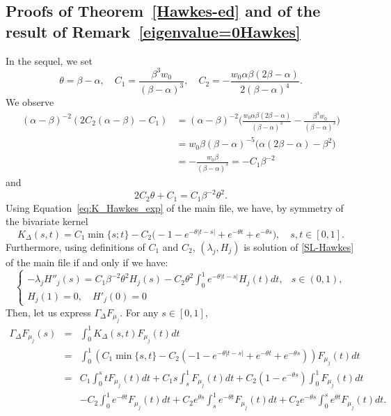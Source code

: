 \documentclass[aos]{imsart}
\theoremstyle{plain}
\theoremstyle{remark}
\newcommand{\1}{1}
\begin{document}
\subsection{Proofs of Theorem~\ref{Hawkes-ed} and of the result of Remark~\ref{eigenvalue=0Hawkes}}
In the sequel, we set
\[
\theta=\beta-\alpha,\quad C_1=\frac{\beta^3w_0}{(\beta-\alpha)^3},\quad C_2=-\frac{w_0\alpha\beta(2\beta-\alpha)}{2(\beta-\alpha)^4}.
\] 
We observe 
\begin{align*}
(\alpha-\beta)^{-2}(2C_2(\alpha-\beta)-C_1)&=(\alpha-\beta)^{-2}\Big(\frac{w_0\alpha\beta(2\beta-\alpha)}{(\beta-\alpha)^3}-\frac{\beta^3w_0}{(\beta-\alpha)^3}\Big)\\
&=w_0\beta(\beta-\alpha)^{-5}\big(\alpha(2\beta-\alpha)-\beta^2\big)\\
&=-\frac{w_0\beta}{(\beta-\alpha)^3}=-C_1\beta^{-2}
\end{align*}
and 
\begin{equation}\label{C1C2}
2C_2\theta +C_1=C_1\beta^{-2}\theta^2.
\end{equation}
Using Equation~\eqref{eq:K_Hawkes_exp} of the main file, we have, by symmetry of the bivariate kernel
\[
K_\Delta(s,t)=C_1\min\{s;t\}-C_2\Big(-1-e^{-\theta|t-s|}+e^{-\theta t}+e^{-\theta s}\Big),\quad s,t\in[0,1].
\]
Furthermore, using definitions of $C_1$ and $C_2$, $(\lambda_j,H_j)$ is solution of \eqref{SL-Hawkes} of the main file if and only if
we have:
\[
\left\{
\begin{array}{ll}
\displaystyle -\lambda_j H''_j(s)=C_1\beta^{-2}\theta^2H_j(s)-C_2\theta^2 \int_0^1 e^{-\theta|t-s|}H_j(t)dt,   &s\in(0,1),\\
H_j(1)  =0,\quad H'_j(0)=0&
\end{array}
\right.
\]
Then, let us express $\Gamma_\Delta F_{\mu_j}$. For any $s\in[0,1]$,
\begin{eqnarray}
\Gamma_\Delta F_{\mu_j}(s) &=& \int_0^1K_\Delta(s,t) F_{\mu_j}(t)dt\nonumber\\
&=&\int_0^1\left(C_1\min\{s,t\}-C_2\left(-1-e^{-\theta|t-s|}+e^{-\theta t}+e^{-\theta s}\right)\right) F_{\mu_j}(t)dt\nonumber\\
&=&C_1\int_0^s t F_{\mu_j}(t)dt+C_1s\int_s^1  F_{\mu_j}(t)dt+C_2(1-e^{-\theta s})\int_0^1 F_{\mu_j}(t)dt \nonumber\\
&&-C_2\int_0^1e^{-\theta t} F_{\mu_j}(t)dt+C_2e^{\theta s}\int_s^1e^{-\theta t} F_{\mu_j}(t)dt+C_2e^{-\theta s}\int_0^se^{\theta t} F_{\mu_j}(t)dt.\nonumber
\end{eqnarray}
\end{document}
